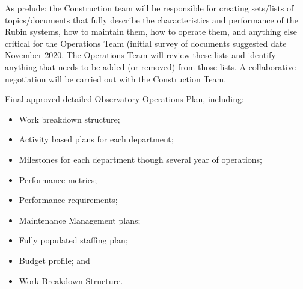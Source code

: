  As prelude: the Construction team will be responsible for creating sets/lists of topics/documents that fully describe the characteristics and performance of the Rubin systems, how to maintain them, how to operate them, and anything else critical for the Operations Team (initial survey of documents suggested date November 2020. The Operations Team will review these lists and identify anything that needs to be added (or removed) from those lists. A collaborative negotiation will be carried out with the Construction Team.

Final approved detailed Observatory Operations Plan, including:

\begin{itemize}

	\item Work breakdown structure;
	\item Activity based plans for each department;
	\item Milestones for each department though several year of operations;
	\item Performance metrics;
	\item Performance requirements;
	\item Maintenance Management plans;
	\item Fully populated staffing plan;
	\item Budget profile; and
	\item Work Breakdown Structure.
	
\end{itemize}